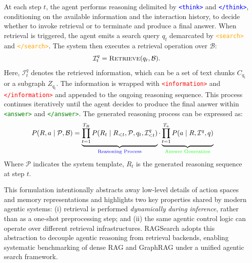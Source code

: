 At each step $t$, the agent performs reasoning delimited by
\texttt{\textcolor{blue}{<think>}} and \texttt{\textcolor{blue}{</think>}},
conditioning on the available information and the interaction history, to decide
whether to invoke retrieval or to terminate and produce a final answer.
When retrieval is triggered, the agent emits a search query $q_t$ demarcated by
\texttt{\textcolor{orange}{<search>}} and \texttt{\textcolor{orange}{</search>}}.
The system then executes a retrieval operation over $\mathcal{B}$:
\begin{equation}
    \mathcal{I}^{q}_{t} = \textsc{Retrieve}(q_t, \mathcal{B}).
\end{equation}
Here, $\mathcal{I}^{q}_{t}$ denotes the retrieved information, which can be a set of
text chunks $C_{q_t}$ or a subgraph $Z_{q_t}$. The information is wrapped with
\texttt{\textcolor{red}{<information>}} and \texttt{\textcolor{red}{</information>}}
and appended to the ongoing reasoning sequence. This process continues iteratively until the agent decides to produce the final answer within \texttt{\textcolor{green}{<answer>}} and \texttt{\textcolor{green}{</answer>}}. The generated reasoning process can be expressed as:
\begin{equation}
\begin{aligned}
P(R,a \mid \mathcal{P},\mathcal{B})
&=
\underbrace{\prod_{t=1}^{T_{R}} P\!\left(R_t \mid R_{<t}, \mathcal{P},q_t, \mathcal{I}^{q}_{<t}\right)}_{\text{\textcolor{blue}{Reasoning Process}}}
\cdot
\underbrace{\prod_{t=1}^{T_a} P\!\left(a \mid R, \mathcal{I}^q,q\right)}_{\text{\textcolor{green}{Answer Generation}}} \, 
\end{aligned}
\end{equation}
Where $\mathcal{P}$ indicates the system template, $R_t$ is the generated reasoning sequence at step $t$.

This formulation intentionally abstracts away low-level details of action spaces and memory representations and highlights two key properties shared by modern agentic systems: (i) retrieval is performed \emph{dynamically during inference}, rather than as a one-shot preprocessing step; and (ii) the same agentic control logic can operate over different retrieval infrastructures. RAGSearch adopts this abstraction to decouple agentic reasoning from retrieval backends, enabling systematic benchmarking of dense RAG and GraphRAG under a unified agentic search framework.

